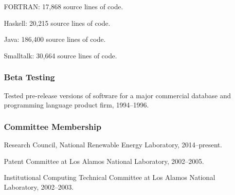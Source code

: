\documentclass[]{article}
\begin{document}
FORTRAN: 17,868 source lines of code.

Haskell: 20,215 source lines of code.

Java: 186,400 source lines of code.

Smalltalk: 30,664 source lines of code.

\subsubsection{Beta Testing}\label{beta-testing}

Tested pre-release versions of software for a major commercial database
and programming language product firm, 1994--1996.

\subsubsection{Committee Membership}\label{committee-membership}

Research Council, National Renewable Energy Laboratory, 2014--present.

Patent Committee at Los Alamos National Laboratory, 2002--2005.

Institutional Computing Technical Committee at Los Alamos National
Laboratory, 2002--2003.
\end{document}
